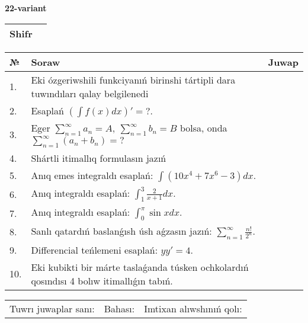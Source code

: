 \documentclass{article}
\begin{document}
  \egroup
  
  \newpage
  
  
  \textbf{22-variant}\\
  
  \bgroup
  \def\arraystretch{1.6} %
  
  \begin{tabular}{|m{5.7cm}|m{9.5cm}|}
  \hline
  Shifr & \\
  \hline
  \end{tabular}
  
  \vspace{1cm}
  
  \begin{tabular}{|m{0.7cm}|m{10cm}|m{4cm}|}
  \hline
  № & Soraw & Juwap \\
  \hline
  1. & Eki ózgeriwshili funkciyanıń birinshi tártipli dara tuwındıları qalay belgilenedi &  \\
  \hline
  2. & Esaplań \(\left( \int{f(x)dx} \right)' = ?\). &  \\
  \hline
  3. & Eger \(\sum_{n = 1}^{\infty}a_{n} = A,\ \sum_{n = 1}^{\infty}b_{n} = B\) bolsa, onda \(\sum_{n = 1}^{\infty}\left( a_{n} + b_{n} \right) = ?\) &  \\
  \hline
  4. & Shártli itimallıq formulasın jazıń &  \\
  \hline
  5. & Anıq emes integraldı esaplań: \(\int{\left( 10x^{4} + 7x^{6} - 3 \right)dx}\). &  \\
  \hline
  6. & Anıq integraldı esaplań: \(\int_{1}^{3}\frac{2}{x + 1}dx\). &  \\
  \hline
  7. & Anıq integraldı esaplań: \(\int_{0}^{\pi}{\sin xdx}\). &  \\
  \hline
  8. & Sanlı qatardıń baslanǵısh úsh aǵzasın jazıń: \(\sum_{n = 1}^{\infty}\frac{n!}{2^{n}}\). &  \\
  \hline
  9. & Differencial teńlemeni esaplań: \(yy' = 4\). &  \\
  \hline
  10. & Eki kubikti bir márte taslaǵanda túsken ochkolardıń qosındısı 4 bolıw itimallıǵın tabıń. &  \\
  \hline
  \end{tabular}
  
  \vspace{1cm}
  
  \begin{tabular}{lll}
  Tuwrı juwaplar sanı: \underline{\hspace{1.5cm}} & 
  Bahası: \underline{\hspace{1.5cm}} & 
  Imtixan alıwshınıń qolı: \underline{\hspace{2cm}} \\
  \end{tabular}
  
\end{document}
